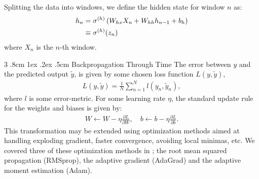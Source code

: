 \documentclass[%
reprint,
amsmath,amssymb,
aps,
]{revtex4-2}
\makeatletter
\renewcommand{\subsubsection}{%
	\@startsection
	{subsubsection}%
	{3}%
	{\z@}%
	{.8cm \@plus1ex \@minus .2ex}%
	{.5cm}%
	{\normalfont\small\centering}%
}
\makeatother
\begin{document}
Splitting the data into windows, we define the hidden state for window \(n\) as:
\begin{align}
	h_{n} &= \sigma^{(h)}\left( W_{hx}X_{n} + W_{hh}h_{n-1} + b_{h} \right) \notag \\
	&\equiv \sigma^{(h)}(z_{n})
\end{align}
where \(X_{n}\) is the \(n\)-th window.

\subsubsection{Backpropagation Through Time}
The error between \(y\) and the predicted output \(\tilde{y}\), is given by some chosen loss function \(L(y, \tilde{y})\),
\begin{align}	
	L(y,\tilde{y}) = \frac{1}{N}\sum\limits_{n=1}^{N} l(y_{n}, \tilde{y}_n),
\end{align}
where \(l\) is some error-metric. 
For some learning rate \(\eta\), the standard update rule for the weights and biases is given by:
\begin{align}
	W\leftarrow W-\eta \frac{\partial L}{\partial W},\quad b\leftarrow b-\eta \frac{\partial L}{\partial b}.
\end{align}
This transformation may be extended using optimization methods aimed at handling exploding gradient, faster convergence, avoiding local minimas, etc. We covered three of these optimization methods in \cite{project2}; the root mean squared propagation (RMSprop), the adaptive gradient (AdaGrad) and the adaptive moment estimation (Adam). 
\end{document}

